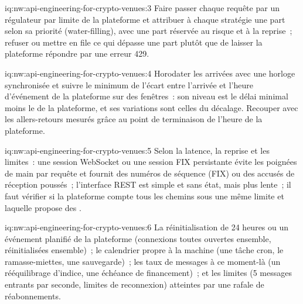\begin{solution}{iq:nw:api-engineering-for-crypto-venues:3}
Faire passer chaque requête par un régulateur par limite de la plateforme et attribuer à chaque stratégie une part selon sa priorité (water-filling), avec une part réservée au risque et
à la reprise~; refuser ou mettre en file ce qui dépasse une part plutôt que de laisser la plateforme répondre par une erreur 429.
\end{solution}

\begin{solution}{iq:nw:api-engineering-for-crypto-venues:4}
Horodater les arrivées avec une horloge synchronisée et suivre le minimum de l'écart entre l'arrivée et l'heure d'événement de la plateforme sur des fenêtres~: son niveau est le délai minimal moins le
 de la plateforme, et ses variations sont celles du décalage. Recouper avec les allers-retours mesurés grâce au point de terminaison de l'heure de la plateforme.
\end{solution}

\begin{solution}{iq:nw:api-engineering-for-crypto-venues:5}
Selon la latence, la reprise et les limites~: une session WebSocket ou une session FIX persistante évite les poignées de main par requête et fournit des numéros de séquence (FIX) ou des
accusés de réception poussés~; l'interface REST est simple et sans état, mais plus lente~; il faut vérifier si la plateforme compte tous les chemins sous une même limite et laquelle propose des .
\end{solution}

\begin{solution}{iq:nw:api-engineering-for-crypto-venues:6}
La réinitialisation de 24 heures ou un événement planifié de la plateforme (connexions toutes ouvertes ensemble, réinitialisées ensemble)~; le calendrier propre à la machine (une tâche cron, le
ramasse-miettes, une sauvegarde)~; les taux de messages à ce moment-là (un rééquilibrage d'indice, une échéance de financement)~; et les limites (5 messages entrants par seconde, limites de
reconnexion) atteintes par une rafale de réabonnements.
\end{solution}
